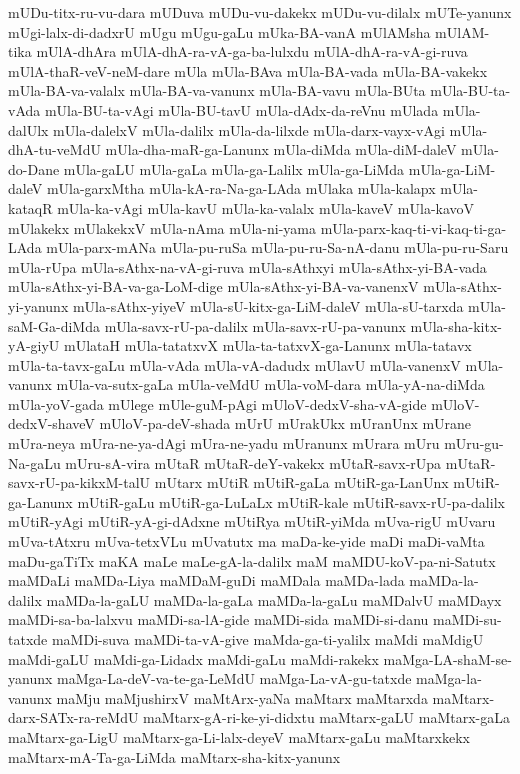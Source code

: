 {mUDu-titx-ru-vu-dara
mUDuva
mUDu-vu-dakekx
mUDu-vu-dilalx
mUTe-yanunx
mUgi-lalx-di-dadxrU
mUgu
mUgu-gaLu
mUka-BA-vanA
mUlAMsha
mUlAM-tika
mUlA-dhAra
mUlA-dhA-ra-vA-ga-ba-lulxdu
mUlA-dhA-ra-vA-gi-ruva
mUlA-thaR-veV-neM-dare
mUla
mUla-BAva
mUla-BA-vada
mUla-BA-vakekx
mUla-BA-va-valalx
mUla-BA-va-vanunx
mUla-BA-vavu
mUla-BUta
mUla-BU-ta-vAda
mUla-BU-ta-vAgi
mUla-BU-tavU
mUla-dAdx-da-reVnu
mUlada
mUla-dalUlx
mUla-dalelxV
mUla-dalilx
mUla-da-lilxde
mUla-darx-vayx-vAgi
mUla-dhA-tu-veMdU
mUla-dha-maR-ga-Lanunx
mUla-diMda
mUla-diM-daleV
mUla-do-Dane
mUla-gaLU
mUla-gaLa
mUla-ga-Lalilx
mUla-ga-LiMda
mUla-ga-LiM-daleV
mUla-garxMtha
mUla-kA-ra-Na-ga-LAda
mUlaka
mUla-kalapx
mUla-kataqR
mUla-ka-vAgi
mUla-kavU
mUla-ka-valalx
mUla-kaveV
mUla-kavoV
mUlakekx
mUlakekxV
mUla-nAma
mUla-ni-yama
mUla-parx-kaq-ti-vi-kaq-ti-ga-LAda
mUla-parx-mANa
mUla-pu-ruSa
mUla-pu-ru-Sa-nA-danu
mUla-pu-ru-Saru
mUla-rUpa
mUla-sAthx-na-vA-gi-ruva
mUla-sAthxyi
mUla-sAthx-yi-BA-vada
mUla-sAthx-yi-BA-va-ga-LoM-dige
mUla-sAthx-yi-BA-va-vanenxV
mUla-sAthx-yi-yanunx
mUla-sAthx-yiyeV
mUla-sU-kitx-ga-LiM-daleV
mUla-sU-tarxda
mUla-saM-Ga-diMda
mUla-savx-rU-pa-dalilx
mUla-savx-rU-pa-vanunx
mUla-sha-kitx-yA-giyU
mUlataH
mUla-tatatxvX
mUla-ta-tatxvX-ga-Lanunx
mUla-tatavx
mUla-ta-tavx-gaLu
mUla-vAda
mUla-vA-dadudx
mUlavU
mUla-vanenxV
mUla-vanunx
mUla-va-sutx-gaLa
mUla-veMdU
mUla-voM-dara
mUla-yA-na-diMda
mUla-yoV-gada
mUlege
mUle-guM-pAgi
mUloV-dedxV-sha-vA-gide
mUloV-dedxV-shaveV
mUloV-pa-deV-shada
mUrU
mUrakUkx
mUranUnx
mUrane
mUra-neya
mUra-ne-ya-dAgi
mUra-ne-yadu
mUranunx
mUrara
mUru
mUru-gu-Na-gaLu
mUru-sA-vira
mUtaR
mUtaR-deY-vakekx
mUtaR-savx-rUpa
mUtaR-savx-rU-pa-kikxM-talU
mUtarx
mUtiR
mUtiR-gaLa
mUtiR-ga-LanUnx
mUtiR-ga-Lanunx
mUtiR-gaLu
mUtiR-ga-LuLaLx
mUtiR-kale
mUtiR-savx-rU-pa-dalilx
mUtiR-yAgi
mUtiR-yA-gi-dAdxne
mUtiRya
mUtiR-yiMda
mUva-rigU
mUvaru
mUva-tAtxru
mUva-tetxVLu
mUvatutx
ma
maDa-ke-yide
maDi
maDi-vaMta
maDu-gaTiTx
maKA
maLe
maLe-gA-la-dalilx
maM
maMDU-koV-pa-ni-Satutx
maMDaLi
maMDa-Liya
maMDaM-guDi
maMDala
maMDa-lada
maMDa-la-dalilx
maMDa-la-gaLU
maMDa-la-gaLa
maMDa-la-gaLu
maMDalvU
maMDayx
maMDi-sa-ba-lalxvu
maMDi-sa-lA-gide
maMDi-sida
maMDi-si-danu
maMDi-su-tatxde
maMDi-suva
maMDi-ta-vA-give
maMda-ga-ti-yalilx
maMdi
maMdigU
maMdi-gaLU
maMdi-ga-Lidadx
maMdi-gaLu
maMdi-rakekx
maMga-LA-shaM-se-yanunx
maMga-La-deV-va-te-ga-LeMdU
maMga-La-vA-gu-tatxde
maMga-la-vanunx
maMju
maMjushirxV
maMtArx-yaNa
maMtarx
maMtarxda
maMtarx-darx-SATx-ra-reMdU
maMtarx-gA-ri-ke-yi-didxtu
maMtarx-gaLU
maMtarx-gaLa
maMtarx-ga-LigU
maMtarx-ga-Li-lalx-deyeV
maMtarx-gaLu
maMtarxkekx
maMtarx-mA-Ta-ga-LiMda
maMtarx-sha-kitx-yanunx
}
